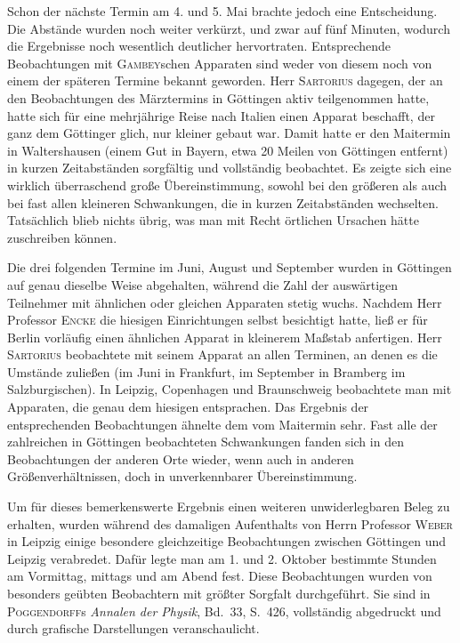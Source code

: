 Schon der nächste Termin am 4. und 5. Mai brachte jedoch eine Entscheidung. Die Abstände wurden noch weiter verkürzt, und zwar auf fünf Minuten, wodurch die Ergebnisse noch wesentlich deutlicher hervortraten. Entsprechende Beobachtungen mit \textsc{Gambey}schen Apparaten sind weder von diesem noch von einem der späteren Termine bekannt geworden. Herr \textsc{Sartorius} dagegen, der an den Beobachtungen des Märztermins in Göttingen aktiv teilgenommen hatte, hatte sich für eine mehrjährige Reise nach Italien einen Apparat beschafft, der ganz dem Göttinger glich, nur kleiner gebaut war. Damit hatte er den Maitermin in Waltershausen (einem Gut in Bayern, etwa 20 Meilen von Göttingen entfernt) in kurzen Zeitabständen sorgfältig und vollständig beobachtet. Es zeigte sich eine wirklich überraschend große Übereinstimmung, sowohl bei den größeren als auch bei fast allen kleineren Schwankungen, die in kurzen Zeitabständen wechselten. Tatsächlich blieb nichts übrig, was man mit Recht örtlichen Ursachen hätte zuschreiben können.

Die drei folgenden Termine im Juni, August und September wurden in Göttingen auf genau dieselbe Weise abgehalten, während die Zahl der auswärtigen Teilnehmer mit ähnlichen oder gleichen Apparaten stetig wuchs. Nachdem Herr Professor \textsc{Encke} die hiesigen Einrichtungen selbst besichtigt hatte, ließ er für Berlin vorläufig einen ähnlichen Apparat in kleinerem Maßstab anfertigen. Herr \textsc{Sartorius} beobachtete mit seinem Apparat an allen Terminen, an denen es die Umstände zuließen (im Juni in Frankfurt, im September in Bramberg im Salzburgischen). In Leipzig, Copenhagen und Braunschweig beobachtete man mit Apparaten, die genau dem hiesigen entsprachen. Das Ergebnis der entsprechenden Beobachtungen ähnelte dem vom Maitermin sehr. Fast alle der zahlreichen in Göttingen beobachteten Schwankungen fanden sich in den Beobachtungen der anderen Orte wieder, wenn auch in anderen Größenverhältnissen, doch in unverkennbarer Übereinstimmung.

Um für dieses bemerkenswerte Ergebnis einen weiteren unwiderlegbaren Beleg zu erhalten, wurden während des damaligen Aufenthalts von Herrn Professor \textsc{Weber} in Leipzig einige besondere gleichzeitige Beobachtungen zwischen Göttingen und Leipzig verabredet. Dafür legte man am 1. und 2. Oktober bestimmte Stunden am Vormittag, mittags und am Abend fest. Diese Beobachtungen wurden von besonders geübten Beobachtern mit größter Sorgfalt durchgeführt. Sie sind in \textsc{Poggendorff}s \textit{Annalen der Physik}, Bd.~33, S.~426, vollständig abgedruckt und durch grafische Darstellungen veranschaulicht.

